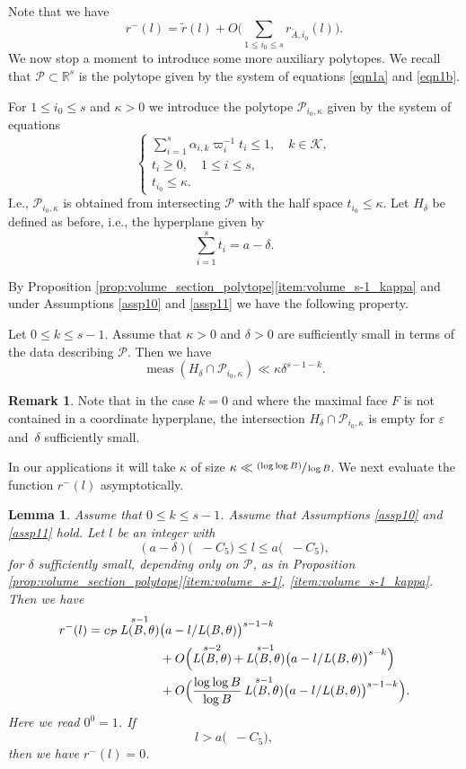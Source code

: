 \documentclass[11pt]{article}
\newcommand{\ie}{i.e.,\xspace}
\numberwithin{equation}{section}
\let\epsilon\varepsilon
\newcommand{\psfrac}[2]{\sfrac{(#1)}{#2}}
\DeclareMathOperator{\LBt}{\mathit{L(B,\theta)}}
\let\del\delta
\let\eps\epsilon
\let\kap\kappa
\newcommand{\calK}{\mathcal{K}}
\newcommand{\calP}{\mathcal{P}}
\newcommand\R{\mathbb{R}}
\DeclareMathOperator{\meas}{meas}
\newtheorem{lemma}[theorem]{Lemma}
\theoremstyle{definition}
\newtheorem{remark}[theorem]{Remark}
\numberwithin{theorem}{section}
\begin{document}
Note that we have
\[
r^-(l)=\tilde{r}(l)+O\biggl(\sum_{1\leq i_0\leq s} r_{\tilde{A},i_0}(l)\biggr).
\]
We now stop a moment to introduce some more auxiliary polytopes. We recall that $\calP\subset \R^s$ is the polytope given by the system of equations \eqref{eqn1a} and \eqref{eqn1b}.\par
For $1\leq i_0\leq s$ and $\kap>0$ we introduce the polytope $\calP_{i_0,\kap}$ given by the system of equations
\[
\begin{cases}
\sum_{i=1}^s \alpha_{i,k} \varpi_i^{-1} t_i\leq 1,\quad k\in \calK,\\
t_i\geq 0,\quad 1\leq i\leq s,\\
t_{i_0}\leq \kap.
\end{cases}
\]
I.e., $\calP_{i_0,\kap}$ is obtained from intersecting $\calP$ with the half space $t_{i_0}\leq \kap$. Let $H_{\del}$ be defined as before, \ie the hyperplane given by
\[
\sum_{i=1}^s t_i= a-\del.
\]

By Proposition \ref{prop:volume_section_polytope}\eqref{item:volume_s-1_kappa} and under Assumptions \ref{assp10} and \ref{assp11} we have the following property.\par
Let $0\leq k\leq s-1$. Assume that $\kappa>0$ and $\del>0$ are sufficiently small in terms of the data describing $\calP$. Then we have
\begin{equation}\label{eqn65a}
\meas (H_{\del}\cap \calP_{i_0,\kap}) \ll \kap\del^{s-1-k}.
\end{equation}

\begin{remark}
Note that in the case $k=0$ and where the maximal face $F$ is not contained in a coordinate hyperplane, the intersection $H_{\del}\cap \calP_{i_0,\kap}$ is empty for $\eps$ and~$\del$ sufficiently small.\end{remark}

In our applications it will take $\kap$ of size $\kap\ll \psfrac{\log \log B}{\log B}$. We next evaluate the function $r^-(l)$ asymptotically.\par

\begin{lemma}\label{rmin}
Assume that $0\leq k\leq s-1$. Assume that Assumptions \ref{assp10} and \ref{assp11} hold.
Let $l$ be an integer with
\[
(a-\del) \bigl(\LBt-C_5\bigr) \leq l\leq a \bigl(\LBt-C_5\bigr) ,
\]
for $\del$ sufficiently small, depending only on $\calP$, as in Proposition \ref{prop:volume_section_polytope}\eqref{item:volume_s-1}, \eqref{item:volume_s-1_kappa}. 
Then we have
\begin{align*}
r^-(l)=c_{\calP} \LBt^{s-1}& \bigl(a- l/{\LBt}\bigr)^{s-1-k} \\
&+O\Bigl(\LBt^{s-2}+ \LBt^{s-1} \bigl(a- l/{\LBt}\bigr)^{s-k}\Bigr)\\
&+ O\Bigl(\frac{\log \log B}{\log B} \LBt^{s-1} \bigl(a- l/{\LBt}\bigr)^{s-1-k} \Bigr) .
\end{align*}
Here we read $0^0=1$.
If
\[
l> a \bigl(\LBt-C_5\bigr) ,
\]
then we have $r^-(l)=0$.
\end{lemma}
\end{document}
